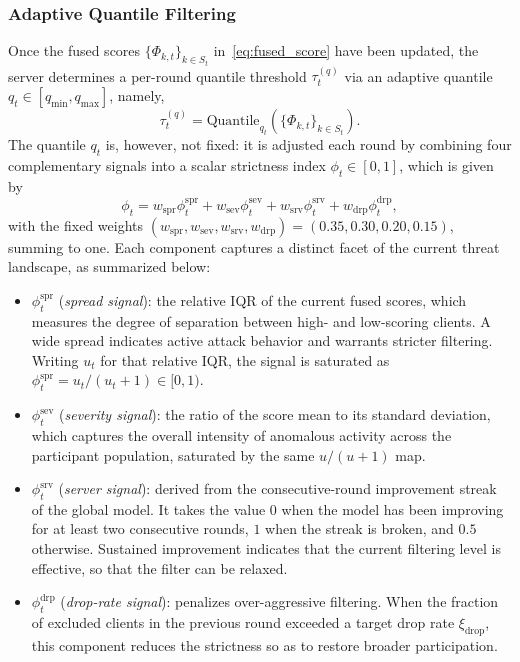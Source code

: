 \documentclass[journal]{IEEEtran}
\begin{document}
\subsubsection{Adaptive Quantile Filtering}
Once the fused scores $\{\Phi_{k,t}\}_{k\in S_t}$ in~\eqref{eq:fused_score} have been updated, the server determines a per-round quantile threshold $\tau_t^{(q)}$ via an adaptive quantile $q_t \in [q_{\min}, q_{\max}]$, namely,
\begin{equation}
\tau_t^{(q)} = \text{Quantile}_{q_t}\!\left(\{\Phi_{k,t}\}_{k \in S_t}\right).
\label{eq:filt_threshold}
\end{equation}
The quantile $q_t$ is, however, not fixed: it is adjusted each round by combining four complementary signals into a scalar strictness index $\phi_t \in [0,1]$, which is given by
\begin{equation}
\phi_t = w_{\mathrm{spr}} \phi_t^{\mathrm{spr}} + w_{\mathrm{sev}} \phi_t^{\mathrm{sev}} + w_{\mathrm{srv}} \phi_t^{\mathrm{srv}} + w_{\mathrm{drp}} \phi_t^{\mathrm{drp}},
\label{eq:strictness}
\end{equation}
with the fixed weights $(w_{\mathrm{spr}}, w_{\mathrm{sev}}, w_{\mathrm{srv}}, w_{\mathrm{drp}}) = (0.35, 0.30, 0.20, 0.15)$, summing to one. Each component captures a distinct facet of the current threat landscape, as summarized below:
\begin{itemize}
    \item $\phi_t^{\mathrm{spr}}$ (\emph{spread signal}): the relative IQR of the current fused scores, which measures the degree of separation between high- and low-scoring clients. A wide spread indicates active attack behavior and warrants stricter filtering. Writing $u_t$ for that relative IQR, the signal is saturated as $\phi_t^{\mathrm{spr}} = u_t/(u_t+1) \in [0,1)$.
    \item $\phi_t^{\mathrm{sev}}$ (\emph{severity signal}): the ratio of the score mean to its standard deviation, which captures the overall intensity of anomalous activity across the participant population, saturated by the same $u/(u+1)$ map.
    \item $\phi_t^{\mathrm{srv}}$ (\emph{server signal}): derived from the consecutive-round improvement streak of the global model. It takes the value $0$ when the model has been improving for at least two consecutive rounds, $1$ when the streak is broken, and $0.5$ otherwise. Sustained improvement indicates that the current filtering level is effective, so that the filter can be relaxed.
    \item $\phi_t^{\mathrm{drp}}$ (\emph{drop-rate signal}): penalizes over-aggressive filtering. When the fraction of excluded clients in the previous round exceeded a target drop rate $\xi_{\mathrm{drop}}$, this component reduces the strictness so as to restore broader participation.
\end{itemize}
\end{document}
